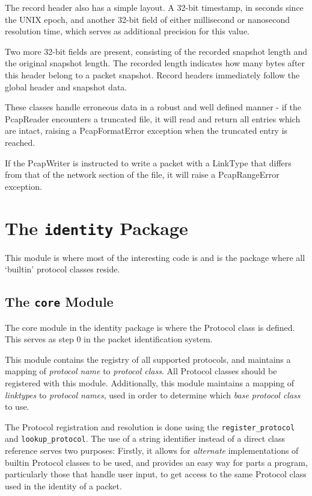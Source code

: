 \documentclass[10pt,a4paper,notitlepage]{report}
\begin{document}
The record header also has a simple layout. A 32-bit timestamp, in seconds since the UNIX epoch, and another 32-bit field of either millisecond or nanosecond resolution time, which serves as additional precision for this value.

Two more 32-bit fields are present, consisting of the recorded snapshot length and the original snapshot length. The recorded length indicates how many bytes after this header belong to a packet snapshot. Record headers immediately follow the global header and snapshot data.

These classes handle erroneous data in a robust and well defined manner - if the PcapReader encounters a truncated file, it will read and return all entries which are intact, raising a PcapFormatError exception when the truncated entry is reached.
 
If the PcapWriter is instructed to write a packet with a LinkType that differs from that of the network section of the file, it will raise a PcapRangeError exception.

\section{The \texttt{identity} Package}
This module is where most of the interesting code is and is the package where all `builtin' protocol classes reside.

\subsection{The \texttt{core} Module}
The core module in the identity package is where the Protocol class is defined. This serves as step 0 in the packet identification system.

This module contains the registry of all supported protocols, and maintains a mapping of \emph{protocol name} to \emph{protocol class}. All Protocol classes should be registered with this module. Additionally, this module maintains a mapping of \emph{linktypes} to \emph{protocol names}, used in order to determine  which \emph{base protocol class} to use.

The Protocol registration and resolution is done using the \texttt{register_protocol} and \texttt{lookup_protocol}. The use of a string identifier instead of a direct class reference serves two purposes: Firstly, it allows for \emph{alternate} implementations of builtin Protocol classes to be used, and provides an easy way for parts a program, particularly those that handle user input, to get access to the same Protocol class used in the identity of a packet.
\end{document}
